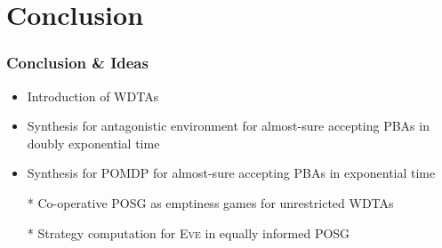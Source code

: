 \documentclass{beamer}
\newcommand{\eve}{\textsc{Eve}}
\begin{document}
  \section{Conclusion}
  \begin{frame}
    \frametitle{Conclusion \& Ideas}
    \begin{itemize}
      \item Introduction of \acp{WDTA}
      \item Synthesis for antagonistic environment for almost-sure accepting
        \acp{PBA} in doubly exponential time
      \item Synthesis for \ac{POMDP} for almost-sure accepting \acp{PBA} in
        exponential time
      \item[*] Co-operative \ac{POSG} as emptiness games for unrestricted
        \acp{WDTA}
      \item[*] Strategy computation for \eve{} in equally informed \ac{POSG}
    \end{itemize}
  \end{frame}

  \appendix
\end{document}
